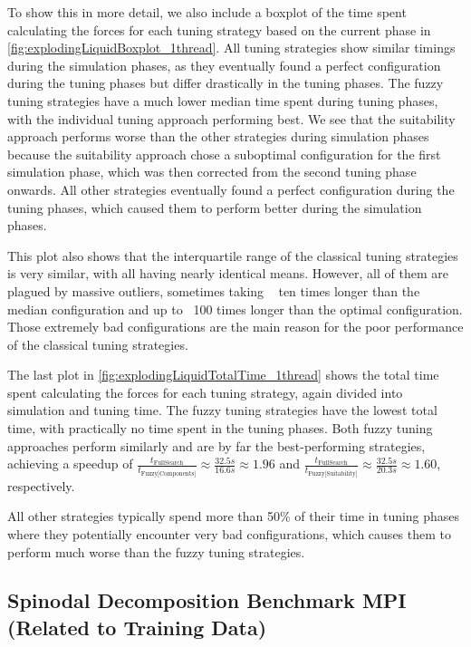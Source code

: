 To show this in more detail, we also include a boxplot of the time spent calculating the forces for each tuning strategy based on the current phase in \autoref{fig:explodingLiquidBoxplot_1thread}. All tuning strategies show similar timings during the simulation phases, as they eventually found a perfect configuration during the tuning phases but differ drastically in the tuning phases. The fuzzy tuning strategies have a much lower median time spent during tuning phases, with the individual tuning approach performing best. We see that the suitability approach performs worse than the other strategies during simulation phases because the suitability approach chose a suboptimal configuration for the first simulation phase, which was then corrected from the second tuning phase onwards. All other strategies eventually found a perfect configuration during the tuning phases, which caused them to perform better during the simulation phases.

This plot also shows that the interquartile range of the classical tuning strategies is very similar, with all having nearly identical means. However, all of them are plagued by massive outliers, sometimes taking ~ ten times longer than the median configuration and up to ~100 times longer than the optimal configuration. Those extremely bad configurations are the main reason for the poor performance of the classical tuning strategies.

The last plot in \autoref{fig:explodingLiquidTotalTime_1thread} shows the total time spent calculating the forces for each tuning strategy, again divided into simulation and tuning time. The fuzzy tuning strategies have the lowest total time, with practically no time spent in the tuning phases. Both fuzzy tuning approaches perform similarly and are by far the best-performing strategies, achieving a speedup of $\frac{t_{\text{FullSearch}}}{t_{\text{Fuzzy[Components]}}} \approx \frac{32.5s}{16.6s} \approx 1.96$ and $\frac{t_{\text{FullSearch}}}{t_{\text{Fuzzy[Suitability]}}} \approx \frac{32.5s}{20.3s} \approx 1.60$, respectively.

All other strategies typically spend more than 50\% of their time in tuning phases where they potentially encounter very bad configurations, which causes them to perform much worse than the fuzzy tuning strategies.


\subsection{Spinodal Decomposition Benchmark MPI (Related to Training Data)}


